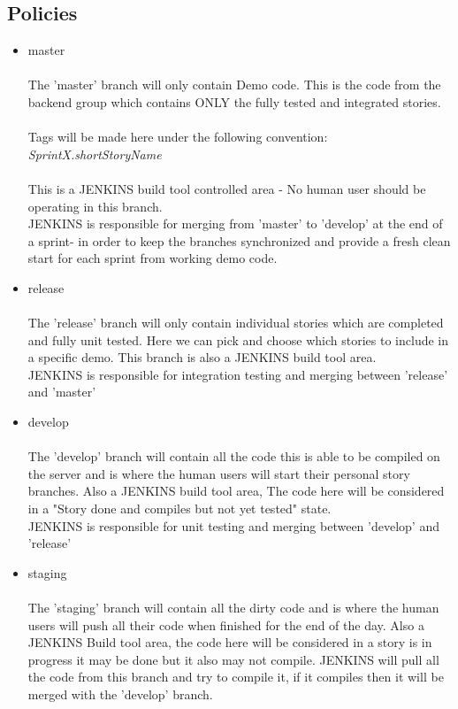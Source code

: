 \documentclass[11pt]{report}
\begin{document}
\subsection {Policies}
\begin{itemize}
\item master\\ \\
The 'master' branch will only contain Demo code. This is the code from the backend group which contains ONLY the fully tested and integrated stories.  \\\\Tags will be made here under the following convention:\\ \emph{SprintX.shortStoryName} \\\\
This is a JENKINS build tool controlled area - No human user should be operating in this branch. \\JENKINS is responsible for  merging from 'master' to 'develop' at the end of a sprint- in order to keep the branches synchronized and provide a fresh clean start for each sprint from working demo code.\\
\item release\\ \\
The 'release' branch will only contain individual stories which are completed and fully unit tested. Here we can pick and choose which stories to include in a specific demo. This branch is also a JENKINS build tool area. \\JENKINS is responsible for integration testing and merging between 'release' and 'master'
\item develop\\ \\
The 'develop' branch will contain all the code this is able to be compiled on the server and is where the human users will start their personal story branches. Also a JENKINS build tool area, The code here will be considered in a "Story done and compiles but not yet tested" state.\\ JENKINS is responsible for unit testing and merging between 'develop' and 'release'

\item staging \\ \\
The 'staging' branch will contain all the dirty code and is where the human users will push all their code when finished for the end of the day. Also a JENKINS Build tool area, the code here will be considered in a story is in progress it may be done but it also may not compile. JENKINS will pull all the code from this branch and try to compile it, if it compiles then it will be merged with the 'develop' branch.


\end{itemize}
\end{document}
